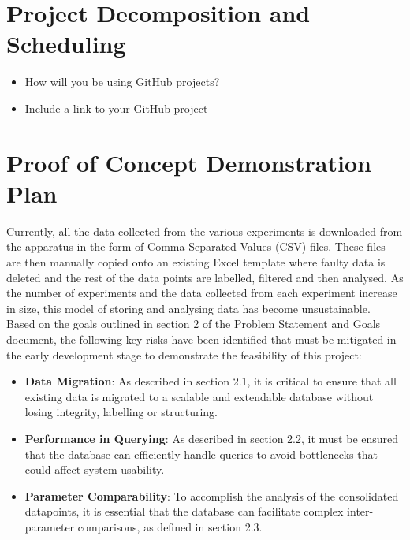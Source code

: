 \documentclass{article}
\begin{document}
\section{Project Decomposition and Scheduling}

\begin{itemize}
  \item How will you be using GitHub projects?
  \item Include a link to your GitHub project
\end{itemize}


\section{Proof of Concept Demonstration Plan}

Currently, all the data collected from the various experiments is downloaded from the 
apparatus in the form of Comma-Separated Values (CSV) files. These files are then manually
copied onto an existing Excel template where faulty data is deleted and the rest of the data points
are labelled, filtered and then analysed. As the number of experiments and the data collected
from each experiment increase in size, this model of storing and analysing data has
become unsustainable.\\
\newline
\noindent Based on the goals outlined in section 2 of the Problem Statement and Goals document,
the following key risks have been identified that must be mitigated in the early development
stage to demonstrate the feasibility of this project:
\begin{itemize}
  \item \textbf{Data Migration}: As described in section 2.1, it is critical to ensure that all existing 
  data is migrated to a scalable and extendable database without losing integrity, labelling or structuring.
  \item \textbf{Performance in Querying}: As described in section 2.2, it must be ensured that the database can 
  efficiently handle queries to avoid bottlenecks that could affect system usability.
  \item \textbf{Parameter Comparability}: To accomplish the analysis of the consolidated datapoints, it is essential
  that the database can facilitate complex inter-parameter comparisons, as defined in section 2.3.
\end{itemize}
\end{document}
